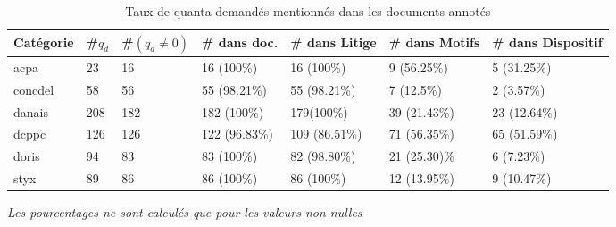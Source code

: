\begin{table}[!htb]
	\scriptsize
	\begin{tabular}{|l|l|l|l|l|l|l|}
		\hline
		\textbf{Catégorie} & \textbf{\#$q_d$} & \textbf{\#$(q_d\neq 0)$} & \textbf{\# dans doc.} & \textbf{\# dans Litige} & \textbf{\# dans Motifs} & \textbf{\# dans Dispositif} \\ \hline
		acpa               & 23                   & 16                                           & 16 (100\%)                   & 16 (100\%)              & 9 (56.25\%)             & 5 (31.25\%)                 \\ \hline
		concdel            & 58                   & 56                                           & 55 (98.21\%)                 & 55 (98.21\%)            & 7 (12.5\%)              & 2 (3.57\%)                  \\ \hline
		danais             & 208                  & 182                                          & 182 (100\%)                  & 179(100\%)              & 39 (21.43\%)            & 23 (12.64\%)                \\ \hline
		dcppc              & 126                  & 126                                          & 122 (96.83\%)                & 109 (86.51\%)           & 71 (56.35\%)            & 65 (51.59\%)                \\ \hline
		doris              & 94                   & 83                                           & 83 (100\%)                   & 82 (98.80\%)            & 21 (25.30)\%            & 6 (7.23\%)                  \\ \hline
		styx               & 89                   & 86                                           & 86 (100\%)                   & 86 (100\%)              & 12 (13.95\%)            & 9 (10.47\%)                 \\ \hline
	\end{tabular}
\textit{Les pourcentages ne sont calculés que pour les valeurs non nulles}
\caption{Taux de quanta demandés mentionnés dans les documents annotés} \label{tab:quanta:mentionQd}
\end{table}

